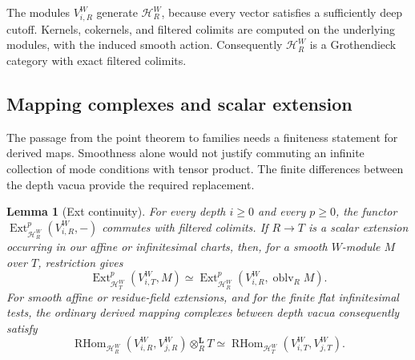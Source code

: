 \documentclass[11pt]{article}
\numberwithin{equation}{section}
\newtheorem{lemma}[theorem]{Lemma}
\theoremstyle{definition}
\theoremstyle{remark}
\begin{document}
The modules \(V_{i,R}^W\) generate \(\mathcal H_R^W\), because every
vector satisfies a sufficiently deep cutoff.  Kernels, cokernels,
and filtered colimits are computed on the underlying modules, with
the induced smooth action.  Consequently \(\mathcal H_R^W\) is a
Grothendieck category with exact filtered colimits.

\subsection{Mapping complexes and scalar extension}

The passage from the point theorem to families needs a finiteness
statement for derived maps.  Smoothness alone would not justify
commuting an infinite collection of mode conditions with tensor
product.  The finite differences between the depth vacua provide
the required replacement.

\begin{lemma}[Ext continuity]\label{walg:ext}
For every depth \(i\geq0\) and every \(p\geq0\), the functor
\(\operatorname{Ext}^p_{\mathcal H_R^W}(V_{i,R}^W,-)\) commutes
with filtered colimits.  If \(R\to T\) is a scalar extension occurring
in our affine or infinitesimal charts, then, for a smooth \(W\)-module
\(M\) over \(T\), restriction gives
\begin{equation}\label{walg:restriction-ext}
 \operatorname{Ext}^p_{\mathcal H_T^W}(V_{i,T}^W,M)
 \simeq
 \operatorname{Ext}^p_{\mathcal H_R^W}
             (V_{i,R}^W,\operatorname{oblv}_R M).
\end{equation}
For smooth affine or residue-field extensions, and for the finite
flat infinitesimal tests, the ordinary derived mapping complexes
between depth vacua consequently satisfy
\begin{equation}\label{walg:mapping-base-change}
 \operatorname{RHom}_{\mathcal H_R^W}(V_{i,R}^W,V_{j,R}^W)
       \otimes_R^{\mathbf L} T
 \simeq
 \operatorname{RHom}_{\mathcal H_T^W}(V_{i,T}^W,V_{j,T}^W).
\end{equation}
\end{lemma}
\end{document}
